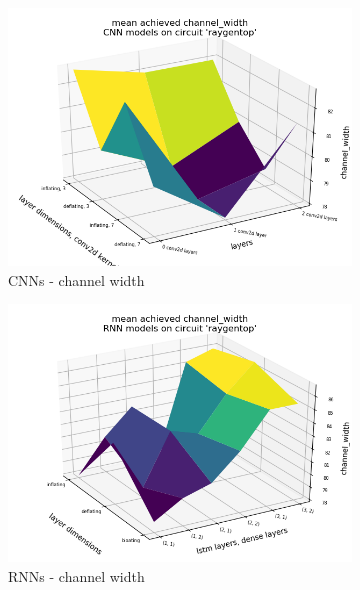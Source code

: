 \begin{figure}
	\begin{subfigure}[b]{0.49\linewidth}
		\includegraphics[width=\linewidth]{plots/cnn-hyperopt-chan-width.png}
		\caption{\glspl{CNN} - channel width}
	\end{subfigure}
	\begin{subfigure}[b]{0.49\linewidth}
		\includegraphics[width=\linewidth]{plots/rnn-hyperopt-chan-width.png}
		\caption{\glspl{RNN} - channel width}
	\end{subfigure}
	\begin{subfigure}[b]{0.49\linewidth}

\end{subfigure}
\end{figure}
